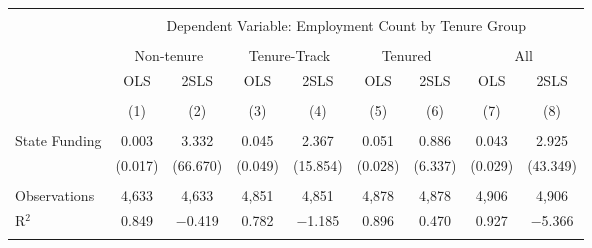 
\begin{tabular}{@{\extracolsep{5pt}}lcccccccc} 
\\[-1.8ex]\hline 
\hline \\[-1.8ex] 
 & \multicolumn{8}{c}{Dependent Variable: Employment Count by Tenure Group} \\ 
\cline{2-9} 
\\[-1.8ex] & \multicolumn{2}{c}{Non-tenure} & \multicolumn{2}{c}{Tenure-Track} & \multicolumn{2}{c}{Tenured} & \multicolumn{2}{c}{All} \\ 
 & OLS & 2SLS & OLS & 2SLS & OLS & 2SLS & OLS & 2SLS \\ 
\\[-1.8ex] & (1) & (2) & (3) & (4) & (5) & (6) & (7) & (8)\\ 
\hline \\[-1.8ex] 
 State Funding & 0.003 & 3.332 & 0.045 & 2.367 & 0.051 & 0.886 & 0.043 & 2.925 \\ 
  & (0.017) & (66.670) & (0.049) & (15.854) & (0.028) & (6.337) & (0.029) & (43.349) \\ 
 \hline \\[-1.8ex] 
Observations & 4,633 & 4,633 & 4,851 & 4,851 & 4,878 & 4,878 & 4,906 & 4,906 \\ 
R$^{2}$ & 0.849 & $-$0.419 & 0.782 & $-$1.185 & 0.896 & 0.470 & 0.927 & $-$5.366 \\ 
\hline 
\hline \\[-1.8ex] 
\end{tabular} 
